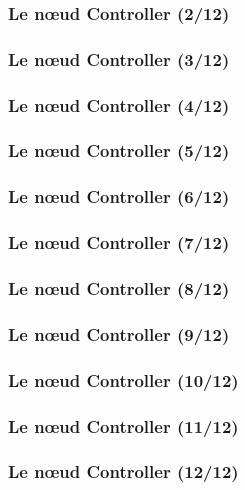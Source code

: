   \begin{frame}
   \frametitle{Le n\oe{}ud Controller (2/12)}
   
    
   
  \end{frame}
  \begin{frame}
   \frametitle{Le n\oe{}ud Controller (3/12)}
   
    
   
  \end{frame}
  \begin{frame}
   \frametitle{Le n\oe{}ud Controller (4/12)}
   
    
   
  \end{frame}
  \begin{frame}
   \frametitle{Le n\oe{}ud Controller (5/12)}
   
    
   
  \end{frame}
  \begin{frame}
   \frametitle{Le n\oe{}ud Controller (6/12)}
   
    
   
  \end{frame}
  \begin{frame}
   \frametitle{Le n\oe{}ud Controller (7/12)}
   
    
   
  \end{frame}
  \begin{frame}
   \frametitle{Le n\oe{}ud Controller (8/12)}
   
    
   
  \end{frame}
  \begin{frame}
   \frametitle{Le n\oe{}ud Controller (9/12)}
   
    
   
  \end{frame}
  \begin{frame}
   \frametitle{Le n\oe{}ud Controller (10/12)}
   
    
   
  \end{frame}
  \begin{frame}
   \frametitle{Le n\oe{}ud Controller (11/12)}
   
    
   
  \end{frame}
  \begin{frame}
   \frametitle{Le n\oe{}ud Controller (12/12)}
   
    
   
  \end{frame}

